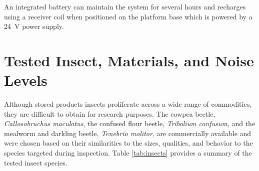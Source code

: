 An integrated battery can maintain the system for several hours and recharges using a receiver coil when positioned on the platform base which is powered by a \SI{24}{\volt} power supply. 





\newpage
\section{Tested Insect, Materials, and Noise Levels}

Although stored products insects proliferate across a wide range of commodities, they are difficult to obtain for research purposes. The cowpea beetle, \textit{Callosobruchus maculatus}, the confused flour beetle, \textit{Tribolium confusum}, and the mealworm and darkling beetle, \textit{Tenebrio molitor}, are commercially available and were chosen based on their similarities to the sizes, qualities, and behavior to the species targeted during inspection. Table \ref{tab:insects} provides a summary of the tested insect species.


